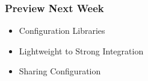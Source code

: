 \begin{frame}
	\frametitle{Preview Next Week}

	\begin{itemize}
	\item Configuration Libraries
	\item Lightweight to Strong Integration
	\item Sharing Configuration
	\end{itemize}
\end{frame}




\nocite{raab2017introducing}

\appendix

\begin{frame}[allowframebreaks]
	
	
\end{frame}




